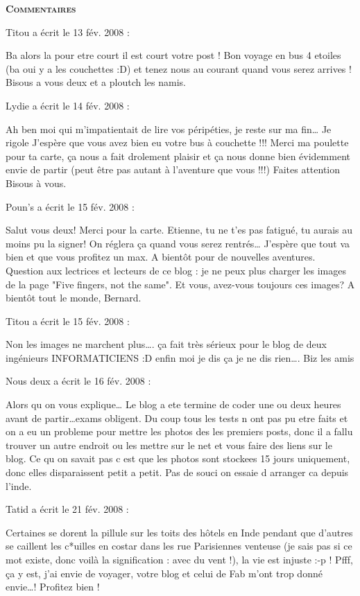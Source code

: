 \bigskip
\textbf{\textsc{Commentaires}}

\medskip
Titou a écrit le 13 fév. 2008 :
\begin{displayquote}
Ba alors la pour etre court il est court votre post ! Bon voyage en bus 4 etoiles (ba oui y a les couchettes :D) et tenez nous au courant quand vous serez arrives ! Bisous a vous deux et a ploutch les namis.
\end{displayquote}

\medskip
Lydie a écrit le 14 fév. 2008 :
\begin{displayquote}
Ah ben moi qui m'impatientait de lire vos péripéties, je reste sur ma fin\dots
Je rigole
J'espère que vous avez bien eu votre bus à couchette !!!
Merci ma poulette pour ta carte, ça nous a fait drolement plaisir et ça nous donne bien évidemment envie de partir (peut être pas autant à l'aventure que vous !!!)
Faites attention
Bisous à vous.
\end{displayquote}

\medskip
Poun's a écrit le 15 fév. 2008 :
\begin{displayquote}
Salut vous deux! Merci pour la carte. Etienne, tu ne t'es pas fatigué, tu aurais au moins pu la signer! On réglera ça quand vous serez rentrés\dots
J'espère que tout va bien et que vous profitez un max.
A bientôt pour de nouvelles aventures.
Question aux lectrices et lecteurs de ce blog : je ne peux plus charger les images de la page "Five fingers, not the same". Et vous, avez-vous toujours ces images?
A bientôt tout le monde, Bernard.
\end{displayquote}

\medskip
Titou a écrit le 15 fév. 2008 :
\begin{displayquote}
Non les images ne marchent plus\dots. ça fait très sérieux pour le blog de deux ingénieurs INFORMATICIENS :D enfin moi je dis ça je ne dis rien\dots. Biz les amis
\end{displayquote}

\medskip
Nous deux a écrit le 16 fév. 2008 :
\begin{displayquote}
Alors qu on vous explique\dots
Le blog a ete termine de coder une ou deux heures avant de partir\dots exams obligent. Du coup tous les tests n ont pas pu etre faits et on a eu un probleme pour mettre les photos des les premiers posts, donc il a fallu trouver un autre endroit ou les mettre sur le net et vous faire des liens sur le blog. Ce qu on savait pas c est que les photos sont stockees 15 jours uniquement, donc elles disparaissent petit a petit. Pas de souci on essaie d arranger ca depuis l'inde.
\end{displayquote}

\medskip
Tatid a écrit le 21 fév. 2008 :
\begin{displayquote}
Certaines se dorent la pillule sur les toits des hôtels en Inde pendant que d'autres se caillent les c*uilles en costar dans les rue Parisiennes venteuse (je sais pas si ce mot existe, donc voilà la signification : avec du vent !), la vie est injuste :-p !
Pfff, ça y est, j'ai envie de voyager, votre blog et celui de Fab m'ont trop donné envie\dots ! Profitez bien !
\end{displayquote}

\vfill
